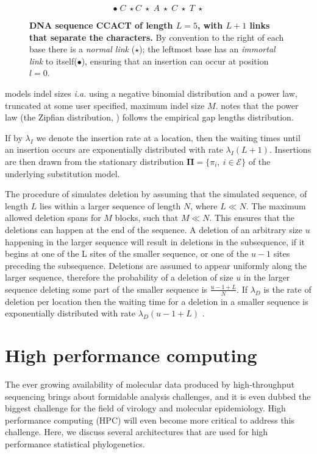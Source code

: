 \begin{figure}
\centering
$$\bullet\; C\;\star C\;\star\; A\;\star\; C\;\star\; T\;\star$$
\caption{
{ \footnotesize 
{\bf DNA sequence CCACT of length $L=5$, with $L+1$ links that separate the characters.} 
By convention to the right of each base there is a \textit{normal link} ($\star$); the leftmost base has an \textit{immortal link} to itself($\bullet$), ensuring that an insertion can occur at position $l=0$.
} %
}
\label{fig:indels}
\end{figure}

\cite{dawg} models indel sizes \textit{i.a.} using a negative binomial distribution and a power law, truncated at some user specified, maximum indel size $M$.
\cite{Benner1993} notes that the power law (the Zipfian distribution, \cite{Gonnet1991}) follows the empirical gap lengths distribution. 

If by $\lambda_{I}$ we denote the insertion rate at a location, then the waiting times until an insertion occurs are exponentially distributed with rate $\lambda_{I}(L+1)$.
Insertions are then drawn from the stationary distribution $\mathbf{\Pi}=\{\pi_{i},\ i\in\mathcal{E}\}$ of the underlying substitution model.

The procedure of \cite{dawg} simulates deletion by assuming that the simulated sequence, of length $L$ lies within a larger sequence of length $N$, where $L\ll N$.
The maximum allowed deletion spans for $M$ blocks, such that $M \ll N$.
This ensures that the deletions can happen at the end of the sequence.
A deletion of an arbitrary size $u$ happening in the larger sequence will result in deletions in the subsequence, if it begins at one of the L sites of the smaller sequence, or one of the $u-1$ sites preceding the subsequence.
Deletions are assumed to appear uniformly along the larger sequence, therefore the probability of a deletion of size $u$ in the larger sequence deleting some part of the smaller sequence is $\frac{u-1+L}{N}$.
If $\lambda_{D}$ is the rate of deletion per location then the waiting time for a deletion in a smaller sequence is exponentially distributed with rate $\lambda_{D}(u-1+L)$ \citep{dawg}.



\section{High performance computing}

The ever growing availability of molecular data produced by high-throughput sequencing brings about formidable analysis challenges, and it is even dubbed the biggest challenge for the field of virology and molecular epidemiology. 
High performance computing (HPC) will even become more critical to address this challenge.
Here, we discuss several architectures that are used for high performance statistical phylogenetics. 

